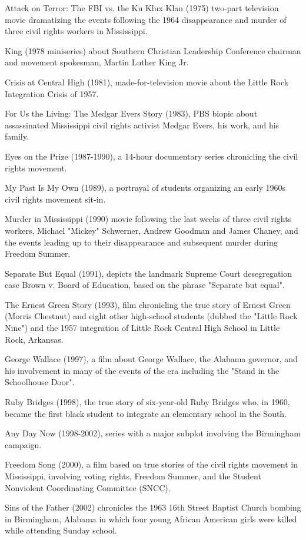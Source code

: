 Attack on Terror: The FBI vs. the Ku Klux Klan (1975) two-part
television movie dramatizing the events following the 1964 disappearance
and murder of three civil rights workers in Mississippi.

King (1978 miniseries) about Southern Christian Leadership Conference
chairman and movement spokesman, Martin Luther King Jr.

Crisis at Central High (1981), made-for-television movie about the
Little Rock Integration Crisis of 1957.

For Us the Living: The Medgar Evers Story (1983), PBS biopic about
assassinated Mississippi civil rights activist Medgar Evers, his work,
and his family.

Eyes on the Prize (1987-1990), a 14-hour documentary series chronicling
the civil rights movement.

My Past Is My Own (1989), a portrayal of students organizing an early
1960s civil rights movement sit-in.

Murder in Mississippi (1990) movie following the last weeks of three
civil rights workers, Michael "Mickey" Schwerner, Andrew Goodman and
James Chaney, and the events leading up to their disappearance and
subsequent murder during Freedom Summer.

Separate But Equal (1991), depicts the landmark Supreme Court
desegregation case Brown v. Board of Education, based on the phrase
"Separate but equal".

The Ernest Green Story (1993), film chronicling the true story of Ernest
Green (Morris Chestnut) and eight other high-school students (dubbed the
"Little Rock Nine") and the 1957 integration of Little Rock Central High
School in Little Rock, Arkansas.

George Wallace (1997), a film about George Wallace, the Alabama
governor, and his involvement in many of the events of the era including
the "Stand in the Schoolhouse Door".

Ruby Bridges (1998), the true story of six-year-old Ruby Bridges who, in
1960, became the first black student to integrate an elementary school
in the South.

Any Day Now (1998-2002), series with a major subplot involving the
Birmingham campaign.

Freedom Song (2000), a film based on true stories of the civil rights
movement in Mississippi, involving voting rights, Freedom Summer, and
the Student Nonviolent Coordinating Committee (SNCC).

Sins of the Father (2002) chronicles the 1963 16th Street Baptist Church
bombing in Birmingham, Alabama in which four young African American
girls were killed while attending Sunday school.

